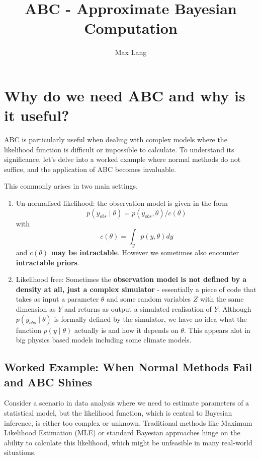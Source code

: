 \documentclass{article}
\title{ABC - Approximate Bayesian Computation}
\author{Max Lang}
\date{}
\begin{document}
\maketitle


\section{Why do we need ABC and why is it useful?}
ABC is particularly useful when dealing with complex models where the likelihood function is difficult or impossible to calculate. To understand its significance, let's delve into a worked example where normal methods do not suffice, and the application of ABC becomes invaluable.

This commonly arises in two main settings.
\begin{enumerate}
    \item Un-normalised likelihood: the observation model is given in the form
$$
p\left(y_{o b s} \mid \theta\right)=p\left(y_{o b s}, \theta\right) / c(\theta)
$$
with
$$
c(\theta)=\int_y p(y, \theta) d y
$$
and\textbf{ $c(\theta)$ may be intractable}. However we sometimes also encounter \textbf{intractable priors}.
\item Likelihood free: Sometimes the \textbf{observation model is not defined by a density at all, just a complex simulator }- essentially a piece of code that takes as input a parameter $\theta$ and some random variables $Z$ with the same dimension as $Y$ and returns as output a simulated realisation of $Y$. Although $p\left(y_{o b s} \mid \theta\right)$ is formally defined by the simulator, we have no idea what the function $p(y \mid \theta)$ actually is and how it depends on $\theta$. This appears alot in big physics based models including some climate models. \cite{martin_bayesian_2022}
\end{enumerate}



\subsection{Worked Example: When Normal Methods Fail and ABC Shines}
Consider a scenario in data analysis where we need to estimate parameters of a statistical model, but the likelihood function, which is central to Bayesian inference, is either too complex or unknown. Traditional methods like Maximum Likelihood Estimation (MLE) or standard Bayesian approaches hinge on the ability to calculate this likelihood, which might be unfeasible in many real-world situations.
\end{document}
